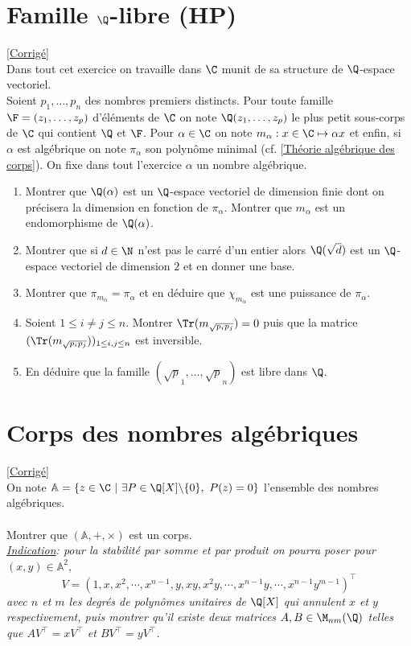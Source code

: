 \documentclass[8pt]{book}
\begin{document}
	\section{Famille $\Q$-libre  (HP)}
	\label{Famille Q-libre}
	\textcolor{blue}{\hyperref[Famille Q-libre corrigé]{[Corrigé]}}\\
	Dans tout cet exercice on travaille dans $\C$ munit de sa structure de $\Q$-espace vectoriel.\\
	Soient $p_1,\dots,p_n$ des nombres premiers distincts. Pour toute famille $\F=(z_1,\dots,z_p)$ d'éléments de $\C$ on note $\Q(z_1,\dots,z_p)$ le plus petit sous-corps de $\C$ qui contient $\Q$ et $\F$. Pour $\alpha\in \C$ on note $m_\alpha:x\in \C\mapsto\alpha x$ et enfin, si $\alpha$ est algébrique on note $\pi_\alpha$ son polynôme minimal (cf. \ref{Théorie algébrique des corps}). On fixe dans tout l'exercice $\alpha$ un nombre algébrique.
	\begin{enumerate}
		\item Montrer que $\Q(\alpha)$ est un $\Q$-espace vectoriel de dimension finie dont on précisera la dimension en fonction de $\pi_\alpha$. Montrer que $m_\alpha$ est un endomorphisme de $\Q(\alpha)$.
		\item Montrer que si $d\in \N$ n'est pas le carré d'un entier alors $\Q(\sqrt d)$ est un $\Q$-espace vectoriel de dimension $2$ et en donner une base.
		\item Montrer que $\pi_{m_\alpha}=\pi_\alpha$ et en déduire que $\chi_{m_\alpha}$ est une puissance de $\pi_\alpha$.
		\item Soient $1\leq i\ne j\leq n$. Montrer $\Tr(m_{\sqrt{p_ip_j}})=0$ puis que la matrice $(\Tr(m_{\sqrt{p_ip_j}}))_{1\leq i,j\leq n}$ est inversible.
		\item En déduire que la famille $(\sqrt p_1,\dots,\sqrt p_n)$ est libre dans $\Q$.
	\end{enumerate}
	
	\section{Corps des nombres algébriques }
	\label{Corps des nombres algébriques}
	\textcolor{blue}{\hyperref[Corps des nombres algébriques corrigé]{[Corrigé]}}\\
	On note $\mathbb A=\{z\in \C\ |\ \exists P\in \Q[X]\backslash\{0\},\ P(z)=0\}$ l'ensemble des nombres algébriques.\\\\
	Montrer que $(\mathbb A,+,\times)$ est un corps.\\
	\textit{\underline{Indication}: pour la stabilité par somme et par produit on pourra poser pour} $(x,y)\in \mathbb A^2$,
	$$V=(1,x,x^{2},\cdots,x^{n-1},y,xy,x^{2}y,\cdots,x^{n-1}y,\cdots,x^{n-1}y^{m-1})^\top$$
	\textit{avec $n$ et $m$ les degrés de polynômes unitaires de $\Q[X]$ qui annulent $x$ et $y$ respectivement, puis montrer qu'il existe deux matrices $A,B\in \M_{nm}(\Q)$ telles que $AV^\top=xV^\top$ et $BV^\top=yV^\top$.}
	
\end{document}
